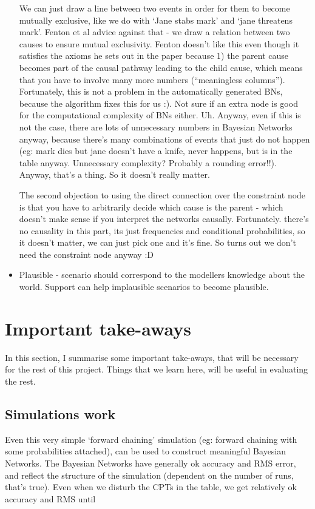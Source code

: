 \begin{itemize}
We can just  draw a line between two events in order for them to become mutually exclusive, like we do with `Jane stabs mark' and `jane threatens mark'. Fenton et al advice against that - we draw a relation between two causes to ensure mutual exclusivity. Fenton doesn't like this even though it satisfies the axioms he sets out in the paper because 1) the parent cause becomes part of the causal pathway leading to the child cause, which means that you have to involve many more numbers (``meaningless columns''). Fortunately, this is not a problem in the automatically generated BNs, because the algorithm fixes this for us :). Not sure if an extra node is good for the computational complexity of BNs either. Uh. Anyway, even if this is not the case, there are lots of unnecessary numbers in Bayesian Networks anyway, because there's many combinations of events that just do not happen (eg: mark dies but jane doesn't have a knife, never happens, but is in the table anyway. Unnecessary complexity? Probably a rounding error!!). Anyway, that's a thing. So it doesn't really matter.

The second objection to using the direct connection over the constraint node is that you have to arbitrarily decide which cause is the parent - which doesn't make sense if you interpret the networks causally. Fortunately. there's no causality in this part, its just frequencies and conditional probabilities, so it doesn't matter, we can just pick one and it's fine. So turns out we don't need the constraint node anyway :D

\item Plausible - scenario should correspond to the modellers knowledge about the world. Support can help implausible scenarios to become plausible.


\end{itemize}


\section{Important take-aways}
In this section, I summarise some important take-aways, that will be necessary for the rest of this project. Things that we learn here, will be useful in evaluating the rest.

\subsection{Simulations work}
Even this very simple `forward chaining' simulation (eg: forward chaining with some probabilities attached), can be used to construct meaningful Bayesian Networks. The Bayesian Networks have generally ok accuracy and RMS error, and reflect the structure of the simulation (dependent on the number of runs, that's true). Even when we disturb the CPTs in the table, we get relatively ok accuracy and RMS until  


